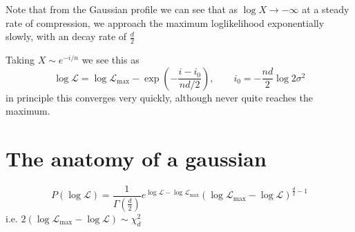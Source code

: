 \documentclass[usenatbib]{mnras} %
\begin{document}
Note that from the Gaussian profile we can see that as $\log X\to-\infty$ at a steady rate of compression, we approach the maximum loglikelihood exponentially slowly, with an decay rate of $\frac{d}{2}$

Taking $X \sim e^{-i/n}$ we see this as
\begin{equation}
    \log\mathcal{L} = \log\mathcal{L}_\mathrm{max} - \exp\left(-\frac{i-i_0}{nd/2}\right), \qquad i_0 = -\frac{nd}{2}\log 2\sigma^2
\end{equation}
in principle this converges very quickly, although never quite reaches the maximum.


\section*{The anatomy of a gaussian}
\begin{equation}
    P(\log\mathcal{L}) = \frac{1}{\Gamma(\frac{d}{2})}e^{\log\mathcal{L}-\log\mathcal{L}_\mathrm{max}} (\log\mathcal{L}_\mathrm{max}-\log\mathcal{L})^{\frac{d}{2}-1}
\end{equation}
i.e. $2(\log\mathcal{L}_\mathrm{max}-\log\mathcal{L})\sim \chi^2_{d} $
\end{document}
